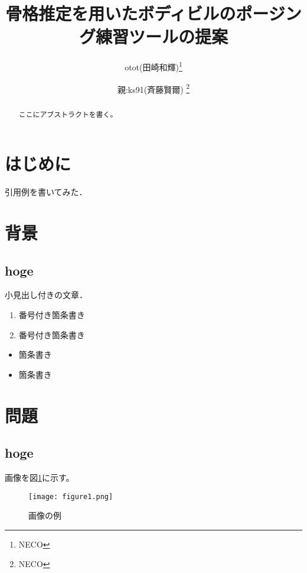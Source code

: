 \documentclass[a4j,10pt]{jsarticle}
\begin{document}

\title{骨格推定を用いたボディビルのポージング練習ツールの提案}

\author{
    otot(田崎和輝)\thanks{NECO}
    \and
    親:ks91(斉藤賢爾) \thanks{NECO}
}

\begin{abstract}
ここにアブストラクトを書く。
\end{abstract}

\maketitle
\thispagestyle{empty}

\section{はじめに}

引用例\cite{example}を書いてみた．

\section{背景}

\subsection{hoge}
小見出し付きの文章．

\begin{enumerate}
\item 番号付き箇条書き 
\item 番号付き箇条書き
\end{enumerate}

\begin{itemize}
\item 箇条書き
\item 箇条書き
\end{itemize}


\section{問題}

\subsection{hoge}
画像を図\ref{sample}に示す。

\begin{figure}[htbp]
    \begin{center}
        \texttt{[image: figure1.png]}
        \caption{画像の例}
        \label{sample}
    \end{center}
\end{figure}
 
\end{document}
